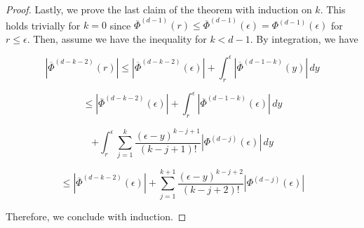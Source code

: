 \begin{proof}
Lastly, we prove the last claim of the theorem with induction on $k$. This holds trivially for $k = 0$ since $\overline{\Phi}^{(d-1)}(r) \leq \overline{\Phi}^{(d-1)}(\epsilon) = \Phi^{(d-1)}(\epsilon)$ for $r \leq \epsilon$. Then, assume we have the inequality for $k < d-1$. By integration, we have

\[|\overline{\Phi}^{(d-k-2)}(r)| \leq |\overline{\Phi}^{(d-k-2)}(\epsilon)| + \int_r^\epsilon |\overline{\Phi}^{(d-1 -k)}(y)| \, dy\]

\[ \leq |\overline{\Phi}^{(d-k-2)}(\epsilon)| + \int_r^\epsilon |\overline{\Phi}^{(d-1 -k)}(\epsilon)| \, dy \]

\[+ \int_r^\epsilon \sum_{j=1}^k \frac{(\epsilon -y)^{k-j+1}}{(k-j+1)!}|\Phi^{(d-j)}(\epsilon)| \, dy\]

\[ \leq  |\overline{\Phi}^{(d-k-2)}(\epsilon)| + \sum_{j=1}^{k+1}  \frac{(\epsilon -y)^{k-j+2}}{(k-j+2)!}|\Phi^{(d-j)}(\epsilon)|\]

Therefore, we conclude with induction.
\end{proof}

\AlmostHarmReal*

